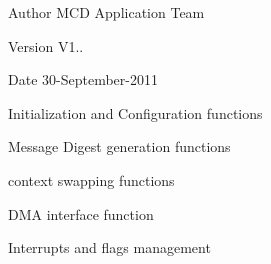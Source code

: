 \begin{DoxyAuthor}{Author}
M\+CD Application Team 
\end{DoxyAuthor}
\begin{DoxyVersion}{Version}
V1.. 
\end{DoxyVersion}
\begin{DoxyDate}{Date}
30-\/\+September-\/2011
\begin{DoxyItemize}
\item Initialization and Configuration functions
\item Message Digest generation functions
\item context swapping functions
\item D\+MA interface function
\item Interrupts and flags management
\end{DoxyItemize}
\end{DoxyDate}
